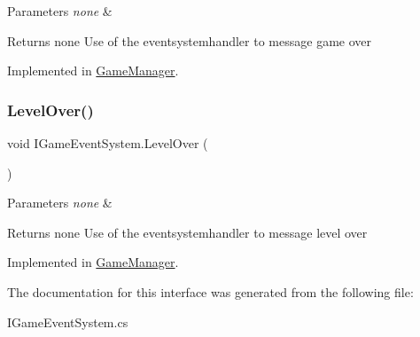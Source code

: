 \begin{DoxyParams}{Parameters}
{\em none} & \\
\hline
\end{DoxyParams}
\begin{DoxyReturn}{Returns}
none Use of the eventsystemhandler to message game over 
\end{DoxyReturn}


Implemented in \mbox{\hyperlink{class_game_manager_a8d69157cb6b97eabeff2374d8e9adeaf}{Game\+Manager}}.

\mbox{\label{interface_i_game_event_system_a1088da77edf39eb4cbfc32a5771f1092}} 
\subsubsection{\texorpdfstring{Level\+Over()}{LevelOver()}}
{\footnotesize\ttfamily void I\+Game\+Event\+System.\+Level\+Over (\begin{DoxyParamCaption}{ }\end{DoxyParamCaption})}


\begin{DoxyParams}{Parameters}
{\em none} & \\
\hline
\end{DoxyParams}
\begin{DoxyReturn}{Returns}
none Use of the eventsystemhandler to message level over 
\end{DoxyReturn}


Implemented in \mbox{\hyperlink{class_game_manager_ad5ae8ae2e2fe74743e89e70b47563639}{Game\+Manager}}.



The documentation for this interface was generated from the following file\+:\begin{DoxyCompactItemize}
\item 
I\+Game\+Event\+System.\+cs\end{DoxyCompactItemize}
